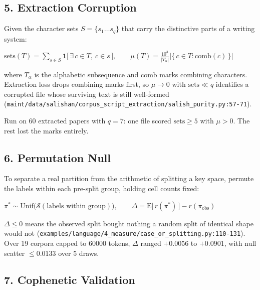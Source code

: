\subsection{5. Extraction Corruption}

Given the character sets \(S = \{s_1 \dots s_q\}\) that carry the distinctive parts of a writing system:

\(\mathrm{sets}(T) = \sum_{s \in S} \mathbf{1}\bigl[\,\exists\, c \in T,\ c \in s\,\bigr], \qquad \mu(T) = \frac{10^3}{|T_\alpha|}\bigl|\{\,c \in T : \mathrm{comb}(c)\,\}\bigr|\)

where \(T_\alpha\) is the alphabetic subsequence and \(\mathrm{comb}\) marks combining characters. Extraction loss drops combining marks first, so \(\mu \to 0\) with \(\mathrm{sets} \ll q\) identifies a corrupted file whose surviving text is still well-formed (\texttt{maint/\allowbreak{}data/\allowbreak{}salishan/\allowbreak{}corpus\_\allowbreak{}script\_\allowbreak{}extraction/\allowbreak{}salish\_\allowbreak{}purity.\allowbreak{}py:57-\allowbreak{}71}).

Run on 60 extracted papers with \(q=7\): one file scored \(\mathrm{sets} \ge 5\) with \(\mu > 0\). The rest lost the marks entirely.

\subsection{6. Permutation Null}

To separate a real partition from the arithmetic of splitting a key space, permute the labels within each pre-split group, holding cell counts fixed:

\(\pi^{\ast} \sim \mathrm{Unif}\bigl(\mathcal{S}(\text{labels within group})\bigr), \qquad \Delta = \mathrm{E}\bigl[\,r(\pi^{\ast})\,\bigr] - r(\pi_{\text{obs}})\)

\(\Delta \le 0\) means the observed split bought nothing a random split of identical shape would not (\texttt{examples/\allowbreak{}language/\allowbreak{}4\_\allowbreak{}measure/\allowbreak{}case\_\allowbreak{}or\_\allowbreak{}splitting.\allowbreak{}py:110-\allowbreak{}131}). Over 19 corpora capped to 60000 tokens, \(\Delta\) ranged \(+0.0056\) to \(+0.0901\), with null scatter \(\le 0.0133\) over 5 draws.

\subsection{7. Cophenetic Validation}

